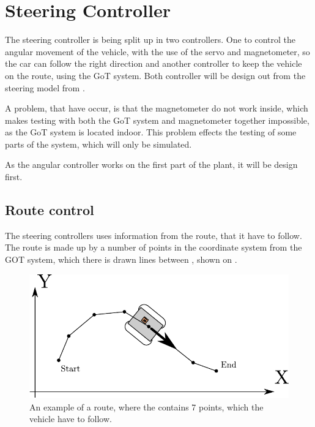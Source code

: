 \section{Steering Controller}\label{sec:steeringController}
The steering controller is being split up in two controllers. One to control the angular movement of the vehicle, with the use of the servo and magnetometer, so the car can follow the right direction and another controller to keep the vehicle on the route, using the GoT system. Both controller will be design out from the steering model from . 

A problem, that have occur, is that the magnetometer do not work inside, which makes testing with both the GoT system and magnetometer together impossible, as the GoT system is located indoor. This problem effects the testing of some parts of the system, which will only be simulated.

As the angular controller works on the first part of the plant, it will be design first.





\subsection{Route control}
The steering controllers uses information from the route, that it have to follow. The route is made up by a number of points in the coordinate system from the GOT system, which there is drawn lines between , shown on .

\begin{figure}[H]
 	\centering
 	\includegraphics[scale=0.7]{figures/stepsGoT}
 	\caption{An example of a route, where the contains 7 points, which the vehicle have to follow.}
 	\label{fig:RCfig1}
\end{figure}

